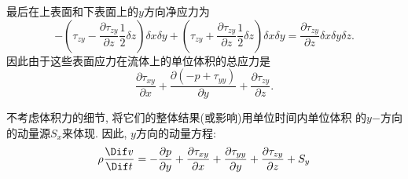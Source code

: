 \documentclass[12pt]{article}
\begin{document}
最后在上表面和下表面上的$y$方向净应力为
\begin{equation}
	-\left(\tau_{z y}-\frac{\partial \tau_{z y}}{\partial z} \frac{1}{2} \delta z\right) \delta x \delta y+\left(\tau_{z y}+\frac{\partial \tau_{z y}}{\partial z} \frac{1}{2} \delta z\right) \delta x \delta y=\frac{\partial \tau_{z y}}{\partial z} \delta x \delta y \delta z.
\end{equation}
因此由于这些表面应力在流体上的单位体积的总应力是
\begin{equation}
	\frac{\partial\tau_{x y}}{\partial x}+\frac{\partial \left(-p+\tau_{y y}\right)}{\partial y}+\frac{\partial \tau_{z y}}{\partial z}.
\end{equation}

不考虑体积力的细节, 将它们的整体结果(或影响)用单位时间内单位体积 的$y$−方向的动量源$S_x$来体现. 因此, $y$方向的动量方程:
\begin{equation}
	\rho \frac{\Dif v}{\Dif t}=-\frac{\partial p}{\partial y}+\frac{\partial \tau_{x y}}{\partial x}+\frac{\partial \tau_{y y}}{\partial y}+\frac{\partial \tau_{z y}}{\partial z}+S_{y}
\end{equation}
\end{document}
